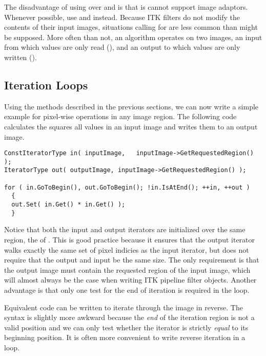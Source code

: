 The disadvantage of using  over  and  is
that is cannot support image adaptors. Whenever possible, use  and
 instead.  Because ITK filters do not modify the contents of their
input images, situations calling for  are less common than might
be supposed.  More often than not, an algorithm operates on two images, an
input from which values are only read (), and an output to which
values are only written ().


\subsection{Iteration Loops}
\label{sec:IterationExample}
Using the methods described in the previous sections, we can now write a simple
example for pixel-wise operations in any image region.  The following code
calculates the squares all values in an input image and writes them to an
output image.

\small
\begin{verbatim}
ConstIteratorType in( inputImage,   inputImage->GetRequestedRegion() );
IteratorType out( outputImage, inputImage->GetRequestedRegion() );

for ( in.GoToBegin(), out.GoToBegin(); !in.IsAtEnd(); ++in, ++out )
  {
  out.Set( in.Get() * in.Get() );
  }
\end{verbatim}
\normalsize

Notice that both the input and output iterators are initialized over the same
region, the  of .  This is good
practice because it ensures that the output iterator walks exactly the same set
of pixel indicies as the input iterator, but does not require that the output
and input be the same size.  The only requirement is that the output image must
contain the requested region of the input image, which will almost always be
the case when writing ITK pipeline filter objects.  Another advantage is that
only one test for the end of iteration is required in the  loop.

Equivalent code can be written to iterate through the image in reverse.
The syntax is slightly more awkward because the \emph{end} of the
iteration region is not a valid position and we can only test whether the
iterator is strictly \emph{equal} to its beginning position.  It is often more
convenient to write reverse iteration in a
 loop.

